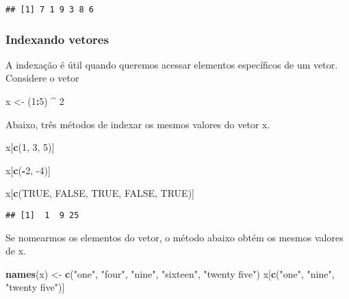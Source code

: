 \documentclass[]{book}
\newenvironment{Shaded}{\begin{snugshade}}{\end{snugshade}}
\newcommand{\DecValTok}[1]{\textcolor[rgb]{0.00,0.00,0.81}{#1}}
\newcommand{\KeywordTok}[1]{\textcolor[rgb]{0.13,0.29,0.53}{\textbf{#1}}}
\newcommand{\NormalTok}[1]{#1}
\newcommand{\OperatorTok}[1]{\textcolor[rgb]{0.81,0.36,0.00}{\textbf{#1}}}
\newcommand{\OtherTok}[1]{\textcolor[rgb]{0.56,0.35,0.01}{#1}}
\newcommand{\StringTok}[1]{\textcolor[rgb]{0.31,0.60,0.02}{#1}}
\theoremstyle{definition}
\theoremstyle{definition}
\theoremstyle{definition}
\theoremstyle{remark}
\begin{document}
\begin{verbatim}
## [1] 7 1 9 3 8 6
\end{verbatim}

\hypertarget{indexando-vetores}{%
\subsubsection{Indexando vetores}\label{indexando-vetores}}

A indexação é útil quando queremos acessar elementos específicos de um vetor.
Considere o vetor

\begin{Shaded}
\begin{Highlighting}[]
\NormalTok{x <-}\StringTok{ }\NormalTok{(}\DecValTok{1}\OperatorTok{:}\DecValTok{5}\NormalTok{) }\OperatorTok{^}\StringTok{ }\DecValTok{2}
\end{Highlighting}
\end{Shaded}

Abaixo, três métodos de indexar os mesmos valores do vetor x.

\begin{Shaded}
\begin{Highlighting}[]
\NormalTok{x[}\KeywordTok{c}\NormalTok{(}\DecValTok{1}\NormalTok{, }\DecValTok{3}\NormalTok{, }\DecValTok{5}\NormalTok{)]}

\NormalTok{x[}\KeywordTok{c}\NormalTok{(}\OperatorTok{-}\DecValTok{2}\NormalTok{, }\DecValTok{-4}\NormalTok{)]}
\end{Highlighting}
\end{Shaded}

\begin{Shaded}
\begin{Highlighting}[]
\NormalTok{x[}\KeywordTok{c}\NormalTok{(}\OtherTok{TRUE}\NormalTok{, }\OtherTok{FALSE}\NormalTok{, }\OtherTok{TRUE}\NormalTok{, }\OtherTok{FALSE}\NormalTok{, }\OtherTok{TRUE}\NormalTok{)]}
\end{Highlighting}
\end{Shaded}

\begin{verbatim}
## [1]  1  9 25
\end{verbatim}

Se nomearmos os elementos do vetor, o método abaixo obtém os mesmos valores de x.

\begin{Shaded}
\begin{Highlighting}[]
\KeywordTok{names}\NormalTok{(x) <-}\StringTok{ }\KeywordTok{c}\NormalTok{(}\StringTok{"one"}\NormalTok{, }\StringTok{"four"}\NormalTok{, }\StringTok{"nine"}\NormalTok{, }\StringTok{"sixteen"}\NormalTok{, }\StringTok{"twenty five"}\NormalTok{)}
\NormalTok{x[}\KeywordTok{c}\NormalTok{(}\StringTok{"one"}\NormalTok{, }\StringTok{"nine"}\NormalTok{, }\StringTok{"twenty five"}\NormalTok{)]}
\end{Highlighting}
\end{Shaded}
\end{document}
